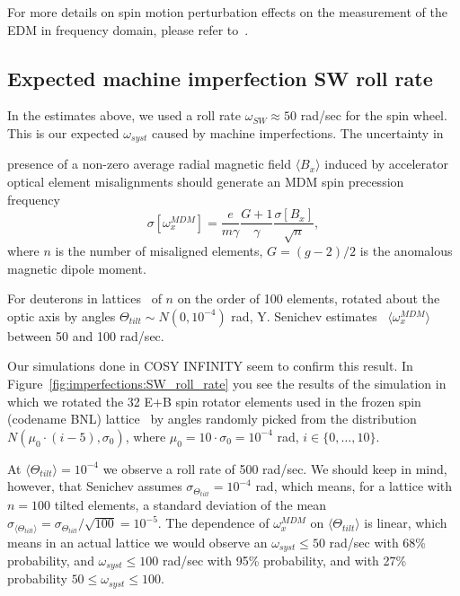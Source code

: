 \documentclass[a4paper]{jacow}
\newcommand{\w}{\omega}
\newcommand{\avg}[1]{\langle{#1}\rangle}
\newcommand{\wsw}{\w_{SW}}
\begin{document}
For more details on spin motion perturbation effects on the measurement of the EDM in frequency domain, 
please refer to~\cite{Aksentev:IPAC19:SMP}.

\subsection{Expected machine imperfection SW roll rate}
In the estimates above, we used a roll rate $\wsw\approx 50$ rad/sec for the spin wheel. This is
our expected $\w_{syst}$ caused by machine imperfections. The
uncertainty in 


presence of a non-zero average
radial magnetic field $\avg{B_x}$ induced by accelerator optical element misalignments should 
generate an MDM spin precession frequency~\cite{Senichev:FDM}
\[
\sigma[\w_x^{MDM}] = \frac{e}{m\gamma}\frac{G+1}{\gamma}\frac{\sigma[B_x]}{\sqrt{n}},
\]
where $n$ is the number of misaligned elements, $G=(g-2)/2$ is the anomalous magnetic dipole moment.

For deuterons in lattices~\cite{Senichev:Lattices} of $n$ on the order of 100 elements, rotated about the
optic axis by angles $\Theta_{tilt}\sim N(0, 10^{-4})$ rad, Y. Senichev estimates~\cite{Senichev:FDM}
$\avg{\w_x^{MDM}}$ between 50 and 100 rad/sec. 

Our simulations done in COSY INFINITY seem to confirm this result. In 
Figure~\ref{fig:imperfections:SW_roll_rate} you see the results of the simulation 
in which we rotated the 32 E+B spin rotator elements used in the frozen spin 
(codename BNL) lattice~\cite{Senichev:Lattices} by angles randomly picked from
the distribution $N(\mu_0\cdot(i-5), \sigma_0)$, where $\mu_0 = 10\cdot\sigma_0 = 10^{-4}$ rad,
$i\in\lbrace0,\dots, 10\rbrace$.

At $\avg{\Theta_{tilt}} = 10^{-4}$ we observe a roll rate of 500 rad/sec. We should keep in mind,  however, that 
Senichev assumes $\sigma_{\Theta_{tilt}} = 10^{-4}$ rad, which means, for a lattice with $n=100$ tilted elements,
a standard deviation of the mean $\sigma_{\avg{\Theta_{tilt}}} = {\sigma_{\Theta_{tilt}}}/{\sqrt{100}} = 10^{-5}$. The dependence of $\w_x^{MDM}$ on $\avg{\Theta_{tilt}}$
is linear, which means in an actual lattice we would observe an $\w_{syst} \le 50$ rad/sec with 68\% probability,
and $\w_{syst} \le 100$ rad/sec with 95\% probability, and with 27\% probability $50 \le\w_{syst}\le 100$.
\end{document}
